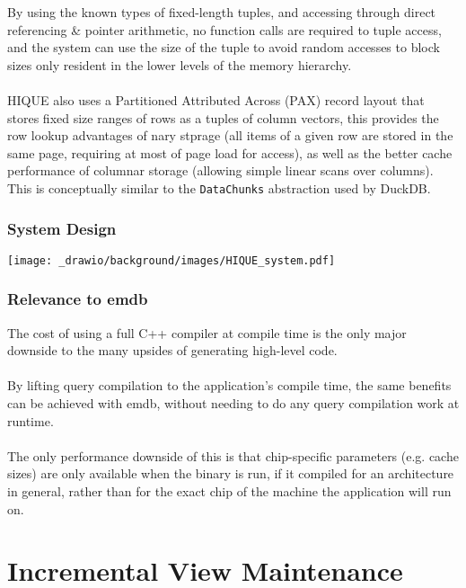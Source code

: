 By using the known types of fixed-length tuples, and accessing through direct referencing \& pointer arithmetic, no function calls are required to tuple access, and the system can use the size of the tuple to avoid random accesses to block sizes only resident in the lower levels of the memory hierarchy.
\\
\\ HIQUE also uses a Partitioned Attributed Across (PAX) record layout\cite{PAXStorageModel} that stores fixed size ranges of rows as a tuples of column vectors, this provides the row lookup advantages of nary stprage (all items of a given row are stored in the same page, requiring at most of page load for access), as well as the better cache performance of columnar storage (allowing simple linear scans over columns). This is conceptually similar to the \texttt{DataChunks} abstraction used by DuckDB.
\subsubsection{System Design}
\begin{center}
    \texttt{[image: \_drawio/background/images/HIQUE\_system.pdf]}
\end{center}
\subsubsection{Relevance to emdb}
The cost of using a full C++ compiler at compile time is the only major downside to the many upsides of generating high-level code.
\\
\\ By lifting query compilation to the application's compile time, the same benefits can be achieved with emdb, without needing to do any query compilation work at runtime.
\\
\\ The only performance downside of this is that chip-specific parameters (e.g. cache sizes) are only available when the binary is run, if it compiled for an architecture in general, rather than for the exact chip of the machine the application will run on.

\section{Incremental View Maintenance}

